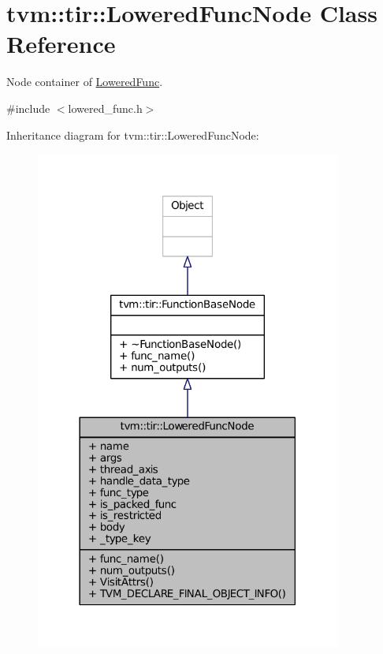 \hypertarget{classtvm_1_1tir_1_1LoweredFuncNode}{}\section{tvm\+:\+:tir\+:\+:Lowered\+Func\+Node Class Reference}
\label{classtvm_1_1tir_1_1LoweredFuncNode}


Node container of \hyperlink{classtvm_1_1tir_1_1LoweredFunc}{Lowered\+Func}.  




{\ttfamily \#include $<$lowered\+\_\+func.\+h$>$}



Inheritance diagram for tvm\+:\+:tir\+:\+:Lowered\+Func\+Node\+:
\nopagebreak
\begin{figure}[H]
\begin{center}
\leavevmode
\includegraphics[width=285pt]{classtvm_1_1tir_1_1LoweredFuncNode__inherit__graph}
\end{center}
\end{figure}


